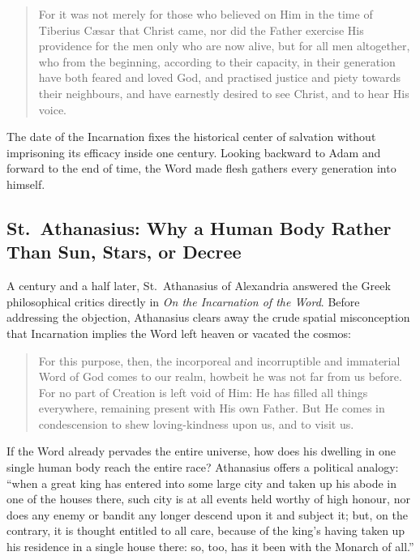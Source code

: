 \begin{quote}
For it was not merely for those who believed on Him in the time of Tiberius C\ae sar that Christ came, nor did the Father exercise His providence for the men only who are now alive, but for all men altogether, who from the beginning, according to their capacity, in their generation have both feared and loved God, and practised justice and piety towards their neighbours, and have earnestly desired to see Christ, and to hear His voice.
\end{quote}

The date of the Incarnation fixes the historical center of salvation without imprisoning its efficacy inside one century. Looking backward to Adam and forward to the end of time, the Word made flesh gathers every generation into himself.

\subsection{St.\ Athanasius: Why a Human Body Rather Than Sun, Stars, or Decree}

A century and a half later, St.\ Athanasius of Alexandria answered the Greek philosophical critics directly in \textit{On the Incarnation of the Word}. Before addressing the objection, Athanasius clears away the crude spatial misconception that Incarnation implies the Word left heaven or vacated the cosmos:

\begin{quote}
For this purpose, then, the incorporeal and incorruptible and immaterial Word of God comes to our realm, howbeit he was not far from us before. For no part of Creation is left void of Him: He has filled all things everywhere, remaining present with His own Father. But He comes in condescension to shew loving-kindness upon us, and to visit us.
\end{quote}

If the Word already pervades the entire universe, how does his dwelling in one single human body reach the entire race? Athanasius offers a political analogy: ``when a great king has entered into some large city and taken up his abode in one of the houses there, such city is at all events held worthy of high honour, nor does any enemy or bandit any longer descend upon it and subject it; but, on the contrary, it is thought entitled to all care, because of the king's having taken up his residence in a single house there: so, too, has it been with the Monarch of all.''

